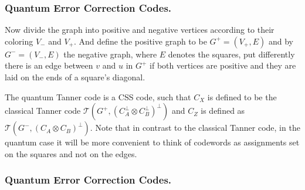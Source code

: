 \documentclass[usenames, aspectratio=169]{beamer}
\begin{document}
\begin{frame}
  \frametitle{ Quantum Error Correction Codes. }
\begin{definition}


Now divide the graph into positive and negative vertices according to their coloring $V_{-}$ and $V_{+}$. And define the positive graph to be $G^{+} = \left( V_{+}, E \right)$ and by $G^{-} = \left( V_{-}, E \right)$ the negative graph, where $E$ denotes the squares, put differently there is an edge between $v$ and $u$ in $G^{+}$ if both vertices are positive and they are laid on the ends of a square's diagonal.


The quantum Tanner code is a CSS code, such that $C_{X}$ is defined to be the classical Tanner code $\mathcal{T}\left(G^{+}, \left(C_{A}^\perp\otimes C_{B}^{\perp}\right)^{\perp} \right)$ and $C_{Z}$ is defined as $\mathcal{T}\left(G^{-}, \left(C_{A}\otimes C_{B}\right)^{\perp} \right)$. Note that in contrast to the classical Tanner code, in the quantum case it will be more convenient to think of codewords as assignments set on the squares and not on the edges.
\end{definition}

\end{frame} 

\begin{frame}
  \frametitle{ Quantum Error Correction Codes. }
\end{frame} 
\end{document}
